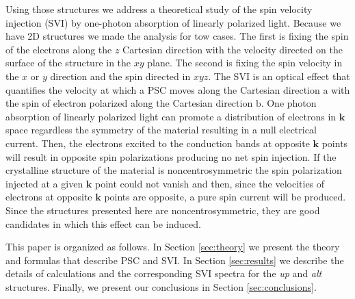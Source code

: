 \documentclass[prb,11pt,tightenlines,twocolumn,aps]{revtex4-1}
\begin{document}
Using those structures we address a theoretical study of the spin velocity
injection (SVI) by one-photon absorption of linearly polarized light.
% 
{\color{red}
% 
Because we have 2D structures we made the analysis for tow cases. The first is
fixing the spin of the electrons along the $z$ Cartesian direction with the
velocity directed on the surface of the structure in the $xy$ plane. The second
is fixing the spin velocity in the $x$ or $y$ direction and the spin directed
in $xyz$.}
% 
The SVI is an optical effect that quantifies the velocity at which a PSC moves
along the Cartesian direction $\mathrm{a}$ with the spin of electron polarized
along the Cartesian direction $\mathrm{b}$. One photon absorption of linearly
polarized light can promote a distribution of electrons in $\mathbf{k}$ space
regardless the symmetry of the material resulting in a null electrical current.
Then, the electrons excited to the conduction bands at opposite $\mathbf{k}$
points will result in opposite spin polarizations producing no net spin
injection.\cite{bhatPRL05} If the crystalline structure of the material is
noncentrosymmetric the spin polarization injected at a given $\mathbf{k}$ point
could not vanish\cite{alvaradoPRL85, schmiedeskampPRL88} 
% 
{\color{red}
% 
and then, since the velocities of electrons at opposite $\mathbf{k}$ points are
opposite, a pure spin current will be produced. Since the structures presented
here are noncentrosymmetric, they are good candidates in which this effect can
be induced.}

This paper is organized as follows. In Section \ref{sec:theory} we present the
theory and formulas that describe PSC and SVI. In Section \ref{sec:results} we
describe the details of calculations and the corresponding SVI spectra for the
\emph{up} and \emph{alt} structures. Finally, we present our conclusions in
Section \ref{sec:conclusions}.


\end{document}
